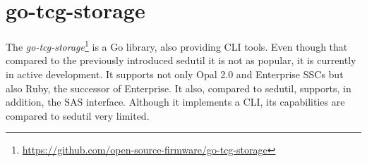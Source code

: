 




\section{go-tcg-storage}

The \emph{go-tcg-storage}\footnote{\url{https://github.com/open-source-firmware/go-tcg-storage}} is a Go library, also providing CLI tools. Even though that compared to the previously introduced sedutil it is not as popular, it is currently in active development. It supports not only Opal 2.0 and Enterprise SSCs but also Ruby, the successor of Enterprise. It also, compared to sedutil, supports, in addition, the SAS interface.
Although it implements a CLI, its capabilities are compared to sedutil very limited.



